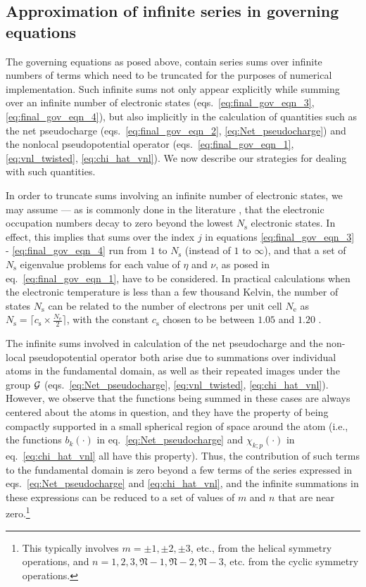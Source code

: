\documentclass[preprint,12pt, 3p, sort&compress]{elsarticle}
\begin{document}
\subsection{Approximation of infinite series in governing equations}
\label{subsec:infinite_sums}
The governing equations as posed above, contain series sums over infinite numbers of terms which need to be truncated for the purposes of numerical implementation. Such infinite sums not only appear explicitly while summing over an infinite number of electronic states (eqs.~\ref{eq:final_gov_eqn_3}, \ref{eq:final_gov_eqn_4}), but also implicitly in the calculation of quantities such as the net pseudocharge (eqs.~\ref{eq:final_gov_eqn_2}, \ref{eq:Net_pseudocharge}) and the nonlocal pseudopotential operator (eqs.~\ref{eq:final_gov_eqn_1}, \ref{eq:vnl_twisted}, \ref{eq:chi_hat_vnl}). We now describe our strategies for dealing with such quantities.

In order to truncate sums involving an infinite number of electronic states, we may assume --- as is commonly done in the literature \citep{Gavini_higher_order, banerjee2018two}, that the electronic occupation numbers decay to zero beyond the lowest $N_{\text{s}}$ electronic states. In effect, this implies that sums over the index $j$ in equations \ref{eq:final_gov_eqn_3} -  \ref{eq:final_gov_eqn_4}  run from $1$ to $N_{\text{s}}$ (instead of $1$ to $\infty$), and that a set of $N_{\text{s}}$ eigenvalue problems for each value of $\eta$ and $\nu$, as posed in eq.~\ref{eq:final_gov_eqn_1}, have to be considered. In practical calculations when the electronic temperature is less than a few thousand Kelvin, the number of states $N_{\text{s}}$ can be related to the number of electrons per unit cell $N_{\text{e}}$ as $\displaystyle N_{\text{s}} = \big\lceil c_{\text{s}} \times \frac{N_{\text{e}}}{2} \big\rceil$, with the constant $c_{\text{s}}$ chosen to be between $1.05$ and $1.20$ \citep{banerjee2018two}.

The infinite sums involved in calculation of the net pseudocharge and the non-local pseudopotential operator both arise due to summations over individual atoms in the fundamental domain, as well as  their repeated images under the group ${\cal G}$ (eqs.~\ref{eq:Net_pseudocharge}, \ref{eq:vnl_twisted}, \ref{eq:chi_hat_vnl}). However, we observe that the functions being summed in these cases are  always centered about the atoms in question, and they have the property of being compactly supported in a small spherical region of space around the atom (i.e., the functions $b_{k}(\cdot)$ in eq.~\ref{eq:Net_pseudocharge} and ${\chi}_{k;p}(\cdot)$ in eq.~\ref{eq:chi_hat_vnl} all have this property). Thus, the contribution of such terms to the fundamental domain is zero beyond a few terms of the series expressed in eqs.~\ref{eq:Net_pseudocharge} and \ref{eq:chi_hat_vnl}, and the infinite summations in these expressions can be reduced to a set of values of $m$ and $n$ that are near zero.\footnote{This typically involves $m = \pm 1, \pm 2, \pm 3$, etc., from the helical symmetry operations, and $n = 1,2,3, \mathfrak{N} - 1, \mathfrak{N} - 2, \mathfrak{N} - 3$, etc. from the cyclic symmetry operations.}
\end{document}
